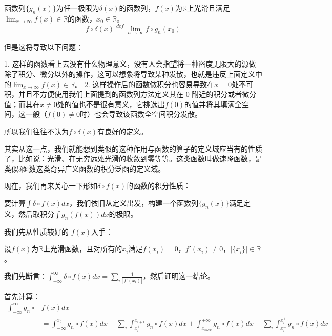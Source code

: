 \documentclass[lang=cn,10pt,newtx,bibend=biber,device=pad]{elegantbook}
\begin{document}
\begin{definition}
函数列$\{g_n(x)\}$为任一极限为$\delta(x)$的函数列，$f(x)$为$\mathbb{R}$上光滑且满足$\lim_{x\rightarrow\infty}f(x)\in\mathbb{R}$的函数，$x_0\in \mathbb{R}$。
\begin{equation}
f\circ \delta(x) \overset{def}{=} \lim_{n\rightarrow\infty} f\circ g_n(x_0)
\end{equation}
\end{definition}

但是这将导致以下问题：

1. 这样的函数看上去没有什么物理意义，没有人会指望将一种密度无限大的源做除了积分、微分以外的操作，这可以想象将导致某种发散，也就是违反上面定义中的$\lim_{x\rightarrow\infty}f(x)\in\mathbb{R}$。
2. 这样操作后的函数做积分也容易导致在$x=0$处不可积，并且不方便使用我们上面提到的函数列方法定义其在 0 附近的积分或者微分值；而其在$x\neq 0$处的值也不是很有意义，它挑选出$f(0)$的值并将其填满全空间，这一般（$f(0)\neq 0$时）也会导致该函数全空间积分发散。

所以我们往往不认为$f\circ \delta(x)$有良好的定义\cite{wheeler1987delta}。

其实从这一点，我们就能想到类似的这种作用与函数的算子的定义域应当有的性质了，比如说：光滑、在无穷远处光滑的收敛到零等等。这类函数叫做速降函数\cite{cheng2004math}，是类似$\delta$函数这类奇异广义函数的积分泛函的定义域。

现在，我们再来关心一下形如$\delta\circ f(x)$的函数的积分性质：

要计算$\int\delta\circ f(x) dx$，我们依旧从定义出发，构建一个函数列$\{g_n(x)\}$满足定义，然后取积分$\int g_n(f(x)) dx$的极限。

我们先从性质较好的 $f(x)$入手：

设$f(x)$为$\mathbb{R}$上光滑函数，且对所有的$x_i$满足$f(x_i) = 0$，$f'(x_i) \neq 0$，$|\{x_i\}| \in\mathbb{R}$。

我们先断言：$\int_{-\infty}^{\infty} \delta\circ f(x) dx = \sum_i \frac{1}{|f'(x_i)|}$，然后证明这一结论。

首先计算：
\begin{equation}
    \begin{aligned}
        \int_{-\infty}^{\infty} g_n\circ &f(x) dx \\
        &= \int_{-\infty}^{x^-_0} g_n\circ f(x) dx+\sum_i \int_{x^+_i}^{x^-_{i+1}} g_n\circ f(x) dx + \int^{+\infty}_{x_{max}} g_n\circ f(x) dx + \sum_i \int_{x_i^-}^{x_i^+} g_n\circ f(x) dx
    \end{aligned}
\end{equation}
\end{document}
